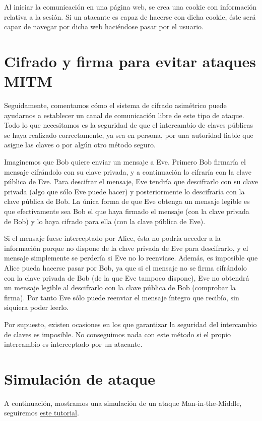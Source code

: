 \documentclass[11pt]{article}
\begin{document}
 Al iniciar la comunicación en una página web, se crea una cookie con información relativa a la sesión. Si un atacante es capaz de hacerse con dicha cookie, éste será capaz de navegar por dicha web haciéndose pasar por el usuario.

\section{Cifrado y firma para evitar ataques MITM}

Seguidamente, comentamos cómo el sistema de cifrado asimétrico puede ayudarnos a establecer un canal de comunicación libre de este tipo de ataque.
Todo lo que necesitamos es la seguridad de que el intercambio de claves públicas se haya realizado correctamente, ya sea en persona, por una
autoridad fiable que asigne las claves o por algún otro método seguro.

Imaginemos que Bob quiere enviar un mensaje a Eve. Primero Bob firmaría el mensaje cifrándolo con su clave privada, y a continuación lo cifraría
con la clave pública de Eve. Para descifrar el mensaje, Eve tendría que descifrarlo con su clave privada (algo que sólo Eve puede hacer) y posteriormente
lo descifraría con la clave pública de Bob. La única forma de que Eve obtenga un mensaje legible es que efectivamente sea Bob el que haya firmado el
 mensaje (con la clave privada de Bob) y lo haya cifrado para ella (con la clave pública de Eve).

Si el mensaje fuese interceptado por Alice, ésta no podría acceder a la información porque no dispone de la clave privada de Eve para descifrarlo,
y el mensaje simplemente se perdería si Eve no lo reenviase.
Además, es imposible que Alice pueda hacerse pasar por Bob, ya que si el mensaje no se firma cifrándolo con la clave privada de Bob (de la que Eve
tampoco dispone), Eve no obtendrá un mensaje legible al descifrarlo con la clave pública de Bob (comprobar la firma). Por tanto Eve sólo puede
reenviar el mensaje íntegro que recibío, sin siquiera poder leerlo.

Por supuesto, existen ocasiones en los que garantizar la seguridad del intercambio de claves es imposible. No conseguimos nada con este método si el
propio intercambio es interceptado por un atacante.

\section{Simulación de ataque}

A continuación, mostramos una simulación de un ataque Man-in-the-Middle, seguiremos
\href{https://www.youtube.com/watch?v=fbXu8EX0hsI}{este tutorial}. 
\end{document}
